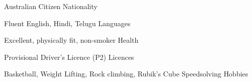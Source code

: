 

\begin{cventries}

  \cventry
    {Australian Citizen} %
    {Nationality} %
    {} %
    {} %
    {}


  \cventry
    {Fluent English, Hindi, Telugu} %
    {Languages} %
    {} %
    {} %
    {}


  \cventry
    {Excellent, physically fit, non-smoker} %
    {Health} %
    {} %
    {} %
    {}

  \cventry
    {Provisional Driver's Licence (P2)} %
    {Licences} %
    {} %
    {} %
    {}

  \cventry
    {Basketball, Weight Lifting, Rock climbing, Rubik's Cube Speedsolving} %
    {Hobbies} %
    {} %
    {} %
    {}

\end{cventries}




